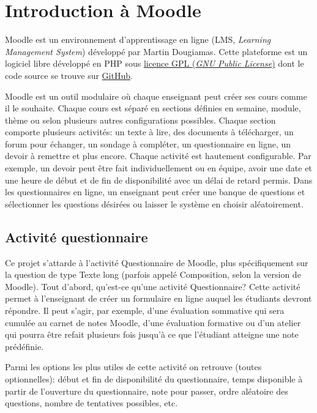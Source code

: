 \chapter{Introduction à Moodle}

Moodle est un environnement d'apprentissage en ligne (LMS, \textit{Learning Management System}) développé par Martin Dougiamas.
Cette plateforme est un logiciel libre développé en PHP sous \href{http://docs.moodle.org/dev/License}{licence GPL (\textit{GNU Public License})} dont le code source se trouve sur \href{https://github.com/moodle/moodle}{GitHub}.

Moodle est un outil modulaire où chaque enseignant peut créer ses cours comme il le souhaite.
Chaque cours est séparé en sections définies en semaine, module, thème ou selon plusieurs autres configurations possibles.
Chaque section comporte plusieurs activités: un texte à lire, des documents à télécharger, un forum pour échanger, un sondage à compléter, un questionnaire en ligne, un devoir à remettre et plus encore.
Chaque activité est hautement configurable.
Par exemple, un devoir peut être fait individuellement ou en équipe, avoir une date et une heure de début et de fin de disponibilité avec un délai de retard permis.
Dans les questionnaires en ligne, un enseignant peut créer une banque de questions et sélectionner les questions désirées ou laisser le système en choisir aléatoirement.

\section{Activité questionnaire}

Ce projet s'attarde à l'activité Questionnaire de Moodle, plus spécifiquement sur la question de type Texte long (parfois appelé Composition, selon la version de Moodle).
Tout d'abord, qu'est-ce qu'une activité Questionnaire?
Cette activité permet à l'enseignant de créer un formulaire en ligne auquel les étudiants devront répondre.
Il peut s'agir, par exemple, d'une évaluation sommative qui sera cumulée au carnet de notes Moodle, d'une évaluation formative ou d'un atelier qui pourra être refait plusieurs fois jusqu'à ce que l'étudiant atteigne une note prédéfinie.

Parmi les options les plus utiles de cette activité on retrouve (toutes optionnelles): début et fin de disponibilité du questionnaire, temps disponible à partir de l'ouverture du questionnaire, note pour passer, ordre aléatoire des questions, nombre de tentatives possibles, etc.

